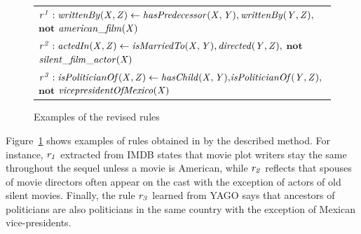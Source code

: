 
\begin{figure}[t]
    \centering
   
    \vspace{-.2cm}
    \begin{tabular}{l}
 {\scriptsize
        $\mathit{r^1: writtenBy(X, Z)}  \leftarrow
        \mathit{hasPredecessor(X, Y)},\mathit{writtenBy(Y, Z)},$ $ \textbf{not}$  $\mathit{american\_film(X)} $}\\        
       {\scriptsize 
$\mathit{r^2:  actedIn(X, Z)}  \leftarrow
        \mathit{isMarriedTo(X, Y)},\mathit{directed(Y, Z)},$ $ \textbf{not}$  $\mathit{silent\_film\_actor(X)} $} \\
          {\scriptsize 
$\mathit{r^3:  isPoliticianOf(X, Z)}  \leftarrow
        \mathit{hasChild(X, Y)}{,}\mathit{isPoliticianOf(Y, Z)}{,}$$ \textbf{not}$  $\mathit{vicepresidentOfMexico(X)} $} \\
 \end{tabular}     
  \vspace{-.2cm}
    \caption{Examples of the revised rules}
 \label{fig:examplerules}
 \vspace{-.6cm}
\end{figure}
 Figure~\ref{fig:examplerules} shows examples of rules obtained in \cite{rumis} by the described method. For instance, $\mathit{r_1}$ extracted from IMDB states that movie plot writers stay the same throughout the sequel unless a movie is American, while $\mathit{r_2}$ reflects that spouses of movie directors often appear on the cast with the exception of actors of old silent movies. Finally, the rule $\mathit{r_3}$ learned from YAGO says that ancestors of politicians are also politicians in the same country with the exception of Mexican vice-presidents.


